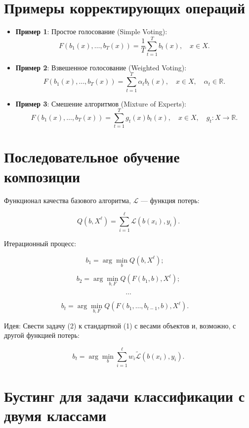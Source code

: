 \section*{Примеры корректирующих операций}

\begin{itemize}
    \item \textbf{Пример 1}: Простое голосование (Simple Voting):
          \[
              F(b_1(x), \ldots, b_T(x)) = \frac{1}{T} \sum_{t=1}^T b_t(x), \quad x \in X.
          \]

    \item \textbf{Пример 2}: Взвешенное голосование (Weighted Voting):
          \[
              F(b_1(x), \ldots, b_T(x)) = \sum_{t=1}^T \alpha_t b_t(x), \quad x \in X, \quad \alpha_t \in \mathbb{R}.
          \]

    \item \textbf{Пример 3}: Смешение алгоритмов (Mixture of Experts):
          \[
              F(b_1(x), \ldots, b_T(x)) = \sum_{t=1}^T g_t(x) b_t(x), \quad x \in X, \quad g_t: X \rightarrow \mathbb{R}.
          \]
\end{itemize}

\section*{Последовательное обучение композиции}

Функционал качества базового алгоритма, \(\mathcal{L}\) — функция потерь:

\[
    Q(b, X^\ell) = \sum_{i=1}^\ell \mathcal{L}(b(x_i), y_i).
\]

Итерационный процесс:

\[
    b_1 = \arg \min_{b} Q(b, X^\ell); \quad \tag{1}
\]

\[
    b_2 = \arg \min_{b, F} Q(F(b_1, b), X^\ell);
\]

\[
    \ldots
\]

\[
    b_t = \arg \min_{b, F} Q(F(b_1, \ldots, b_{t-1}, b), X^\ell). \quad \tag{2}
\]

Идея: Свести задачу (2) к стандартной (1) с весами объектов и, возможно, с другой функцией потерь:

\[
    b_t = \arg \min_{b} \sum_{i=1}^\ell w_i \tilde{\mathcal{L}}(b(x_i), y_i).
\]

\section*{Бустинг для задачи классификации с двумя классами}

